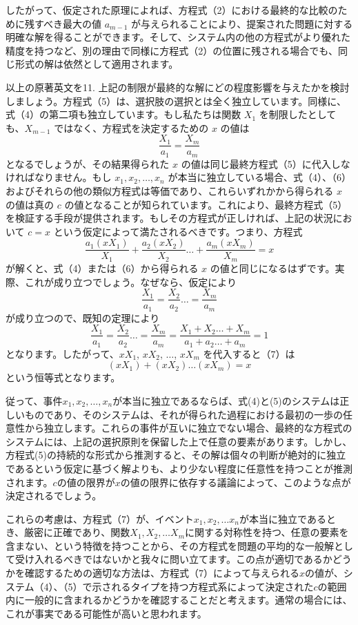 \documentclass[a4paper,11pt,openany]{ltjsbook}
\begin{document}
したがって、仮定された原理によれば、方程式（2）における最終的な比較のために残すべき最大の値 $a_{m-1}$ が与えられることにより、提案された問題に対する明確な解を得ることができます。そして、システム内の他の方程式がより優れた精度を持つなど、別の理由で同様に方程式（2）の位置に残される場合でも、同じ形式の解は依然として適用されます。

以上の原著英文を11. 上記の制限が最終的な解にどの程度影響を与えたかを検討しましょう。方程式（5）は、選択肢の選択とは全く独立しています。同様に、式（4）の第二項も独立しています。もし私たちは関数 $X_1$ を制限したとしても、$X_{m-1}$ ではなく、方程式を決定するための $x$ の値は
\[
  \frac{X_1}{a_1} = \frac{X_m}{a_m}   \tag{6}
\]
となるでしょうが、その結果得られた $x$ の値は同じ最終方程式（5）に代入しなければなりません。もし $x_1, x_2, \dotsc, x_n$ が本当に独立している場合、式（4）、（6）およびそれらの他の類似方程式は等価であり、これらいずれかから得られる $x$ の値は真の $c$ の値となることが知られています。これにより、最終方程式（5）を検証する手段が提供されます。もしその方程式が正しければ、上記の状況において $c = x$ という仮定によって満たされるべきです。つまり、方程式
\[
  \frac{a_1(x X_1)}{X_1}
+ \frac{a_2(x X_2)}{X_2} \dotsc
+ \frac{a_m(x X_m)}{X_m} = x     \tag{7}
\]
が解くと、式（4）または（6）から得られる $x$ の値と同じになるはずです。実際、これが成り立つでしょう。なぜなら、仮定により
\[
  \frac{X_1}{a_1} = \frac{X_2}{a_2} \dotso = \frac{X_m}{a_m}
\]
が成り立つので、既知の定理により
\[
  \frac{X_1}{a_1} = \frac{X_2}{a_2} \dotso = \frac{X_m}{a_m}
= \frac{X_1 + X_2 \dotsc + X_m}{a_1 + a_2 \dotsc + a_m}
= 1
\]
となります。したがって、$xX_1$, $xX_2$, $\dotsc$, $xX_m$ を代入すると（7）は
\[
  (xX_1) + (xX_2)\dotsc (xX_m) = x
\]
という恒等式となります。

従って、事件$x_1, x_2, \dotsc, x_n$が本当に独立であるならば、式(4)と(5)のシステムは正しいものであり、そのシステムは、それが得られた過程における最初の一歩の任意性から独立します。これらの事件が互いに独立でない場合、最終的な方程式のシステムには、上記の選択原則を保留した上で任意の要素があります。しかし、方程式(5)の持続的な形式から推測すると、その解は個々の判断が絶対的に独立であるという仮定に基づく解よりも、より少ない程度に任意性を持つことが推測されます。$c$の値の限界が$x$の値の限界に依存する議論によって、このような点が決定されるでしょう。

これらの考慮は、方程式（7）が、イベント$x_1, x_2, \dotsc x_n$が本当に独立であるとき、厳密に正確であり、関数$X_1, X_2, \dotsc X_m$に関する対称性を持つ、任意の要素を含まない、という特徴を持つことから、その方程式を問題の平均的な一般解として受け入れるべきではないかと我々に問い立てます。この点が適切であるかどうかを確認するための適切な方法は、方程式（7）によって与えられる$x$の値が、システム（4）、（5）で示されるタイプを持つ方程式系によって決定された$c$の範囲内に一般的に含まれるかどうかを確認することだと考えます。通常の場合には、これが事実である可能性が高いと思われます。
\end{document}
